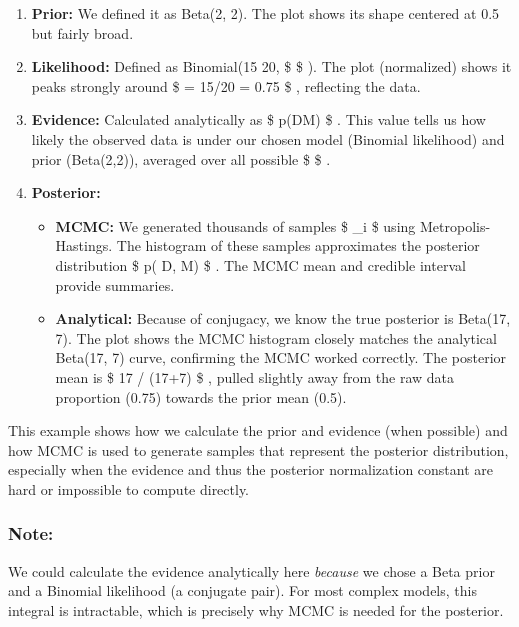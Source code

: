\documentclass[11pt]{article}
\providecommand{\tightlist}{%
      \setlength{\itemsep}{0pt}\setlength{\parskip}{0pt}}
\begin{document}
\begin{enumerate}
\def\labelenumi{\arabic{enumi}.}
\tightlist
\item
  \textbf{Prior:} We defined it as Beta(2, 2). The plot shows its shape
  centered at 0.5 but fairly broad.
\item
  \textbf{Likelihood:} Defined as Binomial(15 \textbar{} 20, \$
  \theta \$ ). The plot (normalized) shows it peaks strongly around \$
  \theta = 15/20 = 0.75 \$ , reflecting the data.
\item
  \textbf{Evidence:} Calculated analytically as \$ p(D\textbar M)
   \$ . This value tells us how likely the observed data
  is under our chosen model (Binomial likelihood) and prior (Beta(2,2)),
  averaged over all possible \$ \theta \$ .
\item
  \textbf{Posterior:}

  \begin{itemize}
  \tightlist
  \item
    \textbf{MCMC:} We generated thousands of samples \$ \theta\_i \$
    using Metropolis-Hastings. The histogram of these samples
    approximates the posterior distribution \$ p(\theta \textbar{} D, M)
    \$ . The MCMC mean and credible interval provide summaries.
  \item
    \textbf{Analytical:} Because of conjugacy, we know the true
    posterior is Beta(17, 7). The plot shows the MCMC histogram closely
    matches the analytical Beta(17, 7) curve, confirming the MCMC worked
    correctly. The posterior mean is \$ 17 / (17+7)  \$ ,
    pulled slightly away from the raw data proportion (0.75) towards the
    prior mean (0.5).
  \end{itemize}
\end{enumerate}

This example shows how we calculate the prior and evidence (when
possible) and how MCMC is used to generate samples that represent the
posterior distribution, especially when the evidence and thus the
posterior normalization constant are hard or impossible to compute
directly.

    \subsubsection{Note:}\label{note}

We could calculate the evidence analytically here \emph{because} we
chose a Beta prior and a Binomial likelihood (a conjugate pair). For
most complex models, this integral is intractable, which is precisely
why MCMC is needed for the posterior.
\end{document}
